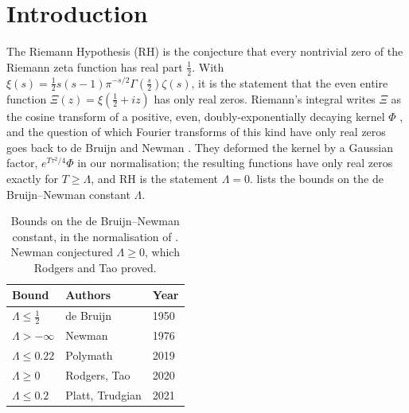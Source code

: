 \documentclass[11pt]{article}
\theoremstyle{definition}\newtheorem{definition}[theorem]{Definition}
\theoremstyle{remark}\newtheorem{remark}[theorem]{Remark}
\begin{document}
\begin{abstract}
For finite baths we prove the Lee--Yang property through the merge. A maximally mixed spin-1, the triad $\{-s,0,s\}$, gives $L=(1+2\cos2\lambda t)/3$ and complete decoherence at exactly $\frac13$ and $\frac23$ of the revival period; it is the merged pair of two Ising spin-$\frac12$'s at coupling $\frac12\ln2$; and every chain of $N$ triads with coupling $K\ge0$ decoheres completely at $2N$ real times per period, counted with multiplicity, and has no partial dips (for $N=2,\dots,6$ at four couplings all roots lie on the circle to $8.2\times10^{-14}$), whereas at $K=-1$ roots leave the circle (to $|z|=13.9393$) and even chains never decohere fully ($|L|\ge0.05311$). The Riemann coherence vanishes at the first five ordinates to $1.0\times10^{-9}$, and a bath of $64$ classical levels reproduces $\gamma_1,\gamma_2,\gamma_3$ to $7.1\times10^{-10}$. The proofs use the Hadamard factorisation of $\Xi$, Riccati bounds for Macdonald functions of imaginary order and the Lee--Yang circle theorem through a merged-pair substitution. We close with an NMR realisation.
\end{abstract}

\section{Introduction}\label{sec:intro}
The Riemann Hypothesis (RH) is the conjecture that every nontrivial zero of the Riemann zeta function has real part $\frac12$. With $\xi(s)=\frac12s(s-1)\pi^{-s/2}\Gamma(\frac s2)\zeta(s)$, it is the statement that the even entire function $\Xi(z)=\xi(\frac12+iz)$ has only real zeros. Riemann's integral writes $\Xi$ as the cosine transform of a positive, even, doubly-exponentially decaying kernel $\Phi$ \cite{Titchmarsh}, and the question of which Fourier transforms of this kind have only real zeros goes back to de Bruijn and Newman \cite{deBruijn,Newman}. They deformed the kernel by a Gaussian factor, $e^{T\tau^2/4}\Phi$ in our normalisation; the resulting functions have only real zeros exactly for $T\ge\Lambda$, and RH is the statement $\Lambda=0$.  lists the bounds on the de Bruijn--Newman constant $\Lambda$.
\begin{table}[h]\centering\small
\begin{tabular}{@{}lll@{}}\toprule
Bound & Authors & Year\\\midrule
$\Lambda\le\frac12$ & de Bruijn \cite{deBruijn} & 1950\\
$\Lambda>-\infty$ & Newman \cite{Newman} & 1976\\
$\Lambda\le0.22$ & Polymath \cite{Polymath} & 2019\\
$\Lambda\ge0$ & Rodgers, Tao \cite{RT} & 2020\\
$\Lambda\le0.2$ & Platt, Trudgian \cite[Cor.~2]{PT} & 2021\\\bottomrule
\end{tabular}
\caption{Bounds on the de Bruijn--Newman constant, in the normalisation of \cite{Polymath}. Newman conjectured $\Lambda\ge0$, which Rodgers and Tao proved.}\label{tab:dbn}
\end{table}
\end{document}
